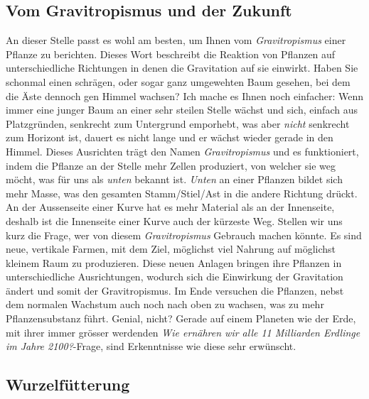 \documentclass[12pt,titlepage,a4paper]{article}
\begin{document}
\subsection{Vom Gravitropismus und der Zukunft}
An dieser Stelle passt es wohl am besten, um Ihnen vom \textit{Gravitropismus} einer Pflanze zu berichten. Dieses Wort beschreibt die Reaktion von Pflanzen auf unterschiedliche Richtungen in denen die Gravitation auf sie einwirkt. Haben Sie schonmal einen schrägen, oder sogar ganz umgewehten Baum gesehen, bei dem die Äste dennoch gen Himmel wachsen? Ich mache es Ihnen noch einfacher: Wenn immer eine junger Baum an einer sehr steilen Stelle wächst und sich, einfach aus Platzgründen, senkrecht zum Untergrund emporhebt, was aber \textit{nicht} senkrecht zum Horizont ist, dauert es nicht lange und er wächst wieder gerade in den Himmel. Dieses Ausrichten trägt den Namen \textit{Gravitropismus} und es funktioniert, indem die Pflanze an der Stelle mehr Zellen produziert, von welcher sie weg möcht, was für uns als \textit{unten} bekannt ist. \textit{Unten} an einer Pflanzen bildet sich mehr Masse, was den gesamten Stamm/Stiel/Ast in die andere Richtung drückt. An der Aussenseite einer Kurve hat es mehr Material als an der Innenseite, deshalb ist die Innenseite einer Kurve auch der kürzeste Weg. Stellen wir uns kurz die Frage, wer von diesem \textit{Gravitropismus} Gebrauch machen könnte. Es sind neue, vertikale Farmen, mit dem Ziel, möglichst viel Nahrung auf möglichst kleinem Raum zu produzieren. Diese neuen Anlagen bringen ihre Pflanzen in unterschiedliche Ausrichtungen, wodurch sich die Einwirkung der Gravitation ändert und somit der Gravitropismus. Im Ende versuchen die Pflanzen, nebst dem normalen Wachstum auch noch nach oben zu wachsen, was zu mehr Pflanzensubstanz führt. Genial, nicht? Gerade auf einem Planeten wie der Erde, mit ihrer immer grösser werdenden \textit{Wie ernähren wir alle 11 Milliarden Erdlinge im Jahre 2100?}-Frage, sind Erkenntnisse wie diese sehr erwünscht.






\subsection{Wurzelfütterung}
\end{document}
